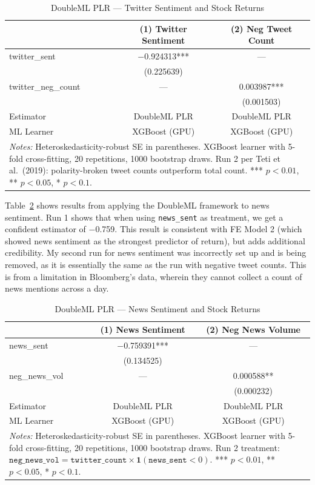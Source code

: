 \documentclass[12pt]{article}
\begin{document}
\begin{table}[htbp]
\centering
\caption{DoubleML PLR --- Twitter Sentiment and Stock Returns}
\label{tab:dml_twitter}
\begin{tabular}{lcc}
\hline\hline
 & (1) Twitter Sentiment & (2) Neg Tweet Count \\
\hline
twitter\_sent & $-$0.924313*** & --- \\
& (0.225639) &  \\
twitter\_neg\_count & --- & 0.003987*** \\
&  & (0.001503) \\
\hline
Estimator & DoubleML PLR & DoubleML PLR \\
ML Learner & XGBoost (GPU) & XGBoost (GPU) \\
\hline\hline
\multicolumn{3}{p{0.9\linewidth}}{\footnotesize \textit{Notes:} Heteroskedasticity-robust SE in parentheses. XGBoost learner with 5-fold cross-fitting, 20 repetitions, 1000 bootstrap draws. Run 2 per Teti et al.\ (2019): polarity-broken tweet counts outperform total count. *** $p<0.01$, ** $p<0.05$, * $p<0.1$.}
\end{tabular}
\end{table}

Table~\ref{tab:dml_news} shows results from applying the DoubleML framework to news sentiment. Run 1 shows that when using \texttt{news\_sent} as treatment, we get a confident estimator of $-$0.759. This result is consistent with FE Model 2 (which showed news sentiment as the strongest predictor of return), but adds additional credibility. My second run for news sentiment was incorrectly set up and is being removed, as it is essentially the same as the run with negative tweet counts. This is from a limitation in Bloomberg's data, wherein they cannot collect a count of news mentions across a day.

\begin{table}[htbp]
\centering
\caption{DoubleML PLR --- News Sentiment and Stock Returns}
\label{tab:dml_news}
\begin{tabular}{lcc}
\hline\hline
 & (1) News Sentiment & (2) Neg News Volume \\
\hline
news\_sent & $-$0.759391*** & --- \\
& (0.134525) &  \\
neg\_news\_vol & --- & 0.000588** \\
&  & (0.000232) \\
\hline
Estimator & DoubleML PLR & DoubleML PLR \\
ML Learner & XGBoost (GPU) & XGBoost (GPU) \\
\hline\hline
\multicolumn{3}{p{0.9\linewidth}}{\footnotesize \textit{Notes:} Heteroskedasticity-robust SE in parentheses. XGBoost learner with 5-fold cross-fitting, 20 repetitions, 1000 bootstrap draws. Run 2 treatment: $\texttt{neg\_news\_vol} = \texttt{twitter\_count} \times \mathbf{1}(\texttt{news\_sent} < 0)$. *** $p<0.01$, ** $p<0.05$, * $p<0.1$.}
\end{tabular}
\end{table}
\end{document}
